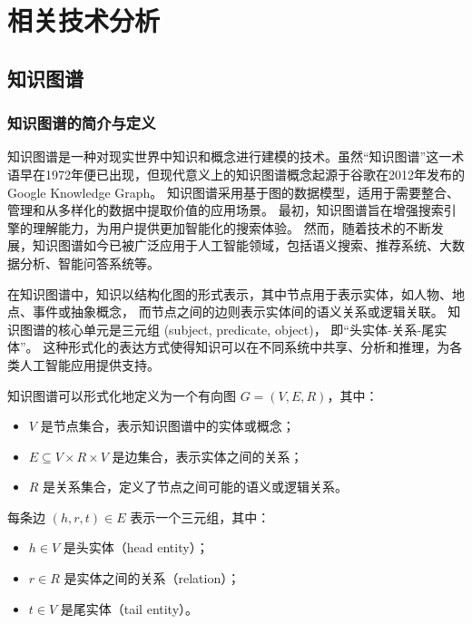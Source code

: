 
\chapter{相关技术分析}

\section{知识图谱}

\subsection{知识图谱的简介与定义}

知识图谱是一种对现实世界中知识和概念进行建模的技术。虽然“知识图谱”这一术语早在1972年便已出现\cite{schneider1973course}，但现代意义上的知识图谱概念起源于谷歌在2012年发布的 Google Knowledge Graph\cite{singhal2012knowledge,zou2020survey}。
知识图谱采用基于图的数据模型，适用于需要整合、管理和从多样化的数据中提取价值的应用场景\cite{noy2019industry}。
最初，知识图谱旨在增强搜索引擎的理解能力，为用户提供更加智能化的搜索体验。
然而，随着技术的不断发展，知识图谱如今已被广泛应用于人工智能领域，包括语义搜索、推荐系统、大数据分析、智能问答系统等。

在知识图谱中，知识以结构化图的形式表示，其中节点用于表示实体，如人物、地点、事件或抽象概念，
而节点之间的边则表示实体间的语义关系或逻辑关联。
知识图谱的核心单元是三元组 (subject, predicate, object)，
即“头实体-关系-尾实体”。
这种形式化的表达方式使得知识可以在不同系统中共享、分析和推理，为各类人工智能应用提供支持。

\vspace{0.5em}

知识图谱可以形式化地定义为一个有向图 $G = (V, E, R)$，其中：
\begin{itemize}
    \item $V$ 是节点集合，表示知识图谱中的实体或概念；
    \item $E \subseteq V \times R \times V$ 是边集合，表示实体之间的关系；
    \item $R$ 是关系集合，定义了节点之间可能的语义或逻辑关系。
\end{itemize}

每条边 $(h, r, t) \in E$ 表示一个三元组，其中：
\begin{itemize}
    \item $h \in V$ 是头实体（head entity）；
    \item $r \in R$ 是实体之间的关系（relation）；
    \item $t \in V$ 是尾实体（tail entity）。
\end{itemize}

